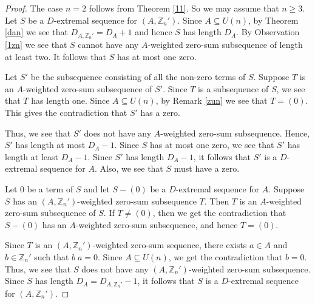 \documentclass[10pt,a4paper]{amsart}
\begin{document}
\begin{proof}
The case $n=2$ follows from Theorem \ref{11}. So we may assume that $n\geq 3$.
Let $S$ be a $D$-extremal sequence for $(A,\mathbb Z_n')$. Since $A\subseteq U(n)$, by Theorem \ref{dan} we see that $D_{A,\mathbb Z_n'}=D_A+1$ and hence $S$ has length $D_A$. By Observation \ref{1zn} we see that $S$ cannot have any $A$-weighted zero-sum subsequence of length at least two. It follows that $S$ has at most one zero.

Let $S'$ be the subsequence consisting of all the non-zero terms of $S$. Suppose $T$ is an $A$-weighted zero-sum subsequence of $S'$. Since $T$ is a subsequence of $S$, we see that $T$ has length one. Since $A\subseteq U(n)$, by Remark \ref{zun} we see that $T=(0)$. This gives the contradiction that $S'$ has a zero.

Thus, we see that $S'$ does not have any $A$-weighted zero-sum subsequence. Hence, $S'$ has length at most $D_A-1$. Since $S$ has at most one zero, we see that $S'$ has length at least $D_A-1$. Since $S'$ has length $D_A-1$, it follows that $S'$ is a $D$-extremal sequence for $A$. Also, we see that $S$ must have a zero.

Let $0$ be a term of $S$ and let $S-(0)$ be a $D$-extremal sequence for $A$. Suppose $S$ has an $(A,\mathbb Z_n')$-weighted zero-sum subsequence $T$. Then $T$ is an $A$-weighted zero-sum subsequence of $S$. If $T\neq (0)$, then we get the contradiction that $S-(0)$ has an $A$-weighted zero-sum subsequence, and hence $T=(0)$.

Since $T$ is an $(A,\mathbb Z_n')$-weighted zero-sum sequence, there exists $a\in A$ and $b\in \mathbb Z_n'$ such that $b\;a=0$. Since $A\subseteq U(n)$, we get the contradiction that $b=0$. Thus, we see that $S$ does not have any $(A,\mathbb Z_n')$-weighted zero-sum subsequence. Since $S$ has length $D_A=D_{A,\mathbb Z_n'}-1$, it follows that $S$ is a $D$-extremal sequence for $(A,\mathbb Z_n')$.
\end{proof}
\end{document}
